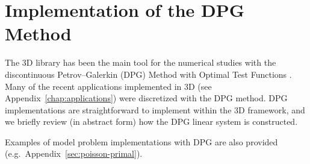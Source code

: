 %
%

\chapter{Implementation of the DPG Method}
\label{chap:dpg}


The \hp3D library has been the main tool for the numerical studies with the discontinuous Petrov--Galerkin (DPG) Method with Optimal Test Functions \cite{demkowicz2017dpg}. Many of the recent applications implemented in \hp3D (see Appendix~\ref{chap:applications}) were discretized with the DPG method. DPG implementations are straightforward to implement within the \hp3D framework, and we briefly review (in abstract form) how the DPG linear system is constructed. 

Examples of model problem implementations with DPG are also provided (e.g.~Appendix~\ref{sec:poisson-primal}).

